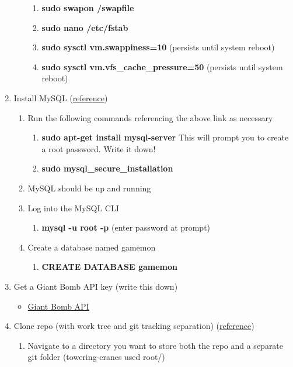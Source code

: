 \documentclass{article}
\begin{document}
\begin{enumerate}
\begin{enumerate}
\begin{enumerate}
      \item \textbf{sudo swapon /swapfile}
      \item \textbf{sudo nano /etc/fstab}
      \item \textbf{sudo sysctl vm.swappiness=10} (persists until system reboot)
      \item \textbf{sudo sysctl vm.vfs\_cache\_pressure=50} (persists until system reboot)
    \end{enumerate}
  \end{enumerate}
  \item Install MySQL (\href{https://www.digitalocean.com/community/tutorials/how-to-install-mysql-on-ubuntu-16-04}{reference})
  \begin{enumerate}
    \item Run the following commands referencing the above link as necessary
    \begin{enumerate}
      \item \textbf{sudo apt-get install mysql-server} This will prompt you to create a root password. Write it down!
      \item \textbf{sudo mysql\_secure\_installation}
    \end{enumerate}
    \item MySQL should be up and running
    \item Log into the MySQL CLI
    \begin{enumerate}
      \item \textbf{mysql -u root -p} (enter password at prompt)
    \end{enumerate}
    \item Create a database named gamemon
    \begin{enumerate}
      \item \textbf{CREATE DATABASE gamemon}
    \end{enumerate}
  \end{enumerate}
  \item Get a Giant Bomb API key (write this down)
  \begin{itemize}
    \item \href{http://www.giantbomb.com/api/}{Giant Bomb API}
  \end{itemize}
  \item Clone repo (with work tree and git tracking separation) (\href{https://www.digitalocean.com/community/tutorials/how-to-set-up-automatic-deployment-with-git-with-a-vps}{reference})
  \begin{enumerate}
    \item Navigate to a directory you want to store both the repo and a separate git folder (towering-cranes used root/)

\end{enumerate}
\end{enumerate}
\end{document}
